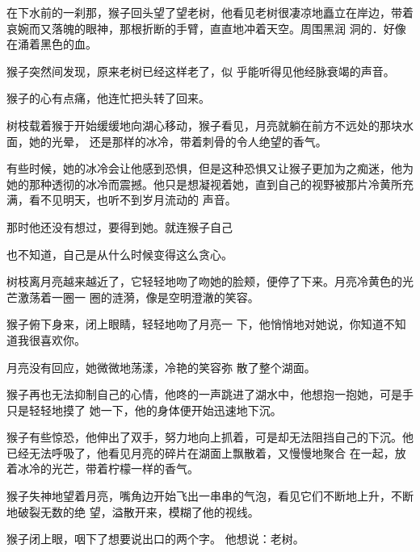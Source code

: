 \documentclass{article}
\begin{document}
\newpage

在下水前的一刹那，猴子回头望了望老树，他看见老树很凄凉地矗立在岸边，带着哀婉而又落魄的眼神，那根折断的手臂，直直地冲着天空。周围黑润
洞的．好像在涌着黑色的血。 

猴子突然间发现，原来老树已经这样老了，似
乎能听得见他经脉衰竭的声音。 


猴子的心有点痛，他连忙把头转了回来。 

树枝载着猴于开始缓缓地向湖心移动，猴子看见，月亮就躺在前方不远处的那块水面，她的光晕，
还是那样的冰冷，带着刺骨的令人绝望的香气。 

有些时候，她的冰冷会让他感到恐惧，但是这种恐惧又让猴子更加为之痴迷，他为她的那种透彻的冰冷而震撼。他只是想凝视着她，直到自己的视野被那片冷黄所充满，看不见明天，也听不到岁月流动的
声音。 

那时他还没有想过，要得到她。就连猴子自己
\newpage

也不知道，自己是从什么时候变得这么贪心。 

树枝离月亮越来越近了，它轻轻地吻了吻她的脸颊，便停了下来。月亮冷黄色的光芒激荡着一圈一
圈的涟漪，像是空明澄澈的笑容。 

猴子俯下身来，闭上眼睛，轻轻地吻了月亮一
下，他悄悄地对她说，你知道不知道我很喜欢你。 

月亮没有回应，她微微地荡漾，冷艳的笑容弥
散了整个湖面。 

猴子再也无法抑制自己的心情，他咚的一声跳进了湖水中，他想抱一抱她，可是手只是轻轻地摸了
她一下，他的身体便开始迅速地下沉。 

猴子有些惊恐，他伸出了双手，努力地向上抓着，可是却无法阻挡自己的下沉。他已经无法呼吸了，他看见月亮的碎片在湖面上飘散着，又慢慢地聚合
在一起，放着冰冷的光芒，带着柠檬一样的香气。 

\newpage

猴子失神地望着月亮，嘴角边开始飞出一串串的气泡，看见它们不断地上升，不断地破裂无数的绝
望，溢散开来，模糊了他的视线。 


猴子闭上眼，咽下了想要说出口的两个字。 他想说：老树。
\end{document}
